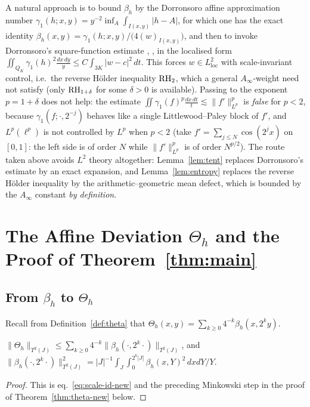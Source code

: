 \begin{remark}\label{rem:why-rh2}
	A natural approach is to bound $\beta_h$ by the Dorronsoro affine approximation
	number $\gamma_1(h;x,y)=y^{-2}\inf_A\int_{I(x,y)}|h-A|$, for which one has the
	exact identity $\beta_h(x,y)=\gamma_1(h;x,y)/\bigl(4(w)_{I(x,y)}\bigr)$, and
	then to invoke Dorronsoro's square-function estimate \cite{Do},
	\cite[Thm.~1.42]{DS}, in the localised form
	$\iint_{Q_K}\gamma_1(h)^2\frac{dx\,dy}{y}\le C\int_{3K}|w-c|^2\,dt$. This forces
	$w\in L^2_{\mathrm{loc}}$ with scale-invariant control, i.e.\ the reverse
	H\"older inequality $\mathrm{RH}_2$, which a general $A_\infty$-weight need not satisfy
	(only $\mathrm{RH}_{1+\delta}$ for some $\delta>0$ is available). Passing to the
	exponent $p=1+\delta$ does not help: the estimate
	$\iint\gamma_1(f)^p\frac{dx\,dt}{t}\lesssim\|f'\|_{L^p}^p$ is \emph{false} for
	$p<2$, because $\gamma_1(f;\cdot,2^{-j})$ behaves like a single
	Littlewood--Paley block of $f'$, and $L^p(\ell^p)$ is not controlled by $L^p$
	when $p<2$ (take $f'=\sum_{j\le N}\cos(2^jx)$ on $[0,1]$: the left side is of
	order $N$ while $\|f'\|_{L^p}^p$ is of order $N^{p/2}$). The route taken above
	avoids $L^2$ theory altogether: Lemma~\ref{lem:tent} replaces Dorronsoro's
	estimate by an exact expansion, and Lemma~\ref{lem:entropy} replaces the
	reverse H\"older inequality by the arithmetic--geometric mean defect, which is
	bounded by the $A_\infty$ constant \emph{by definition}.
\end{remark}

\section{\texorpdfstring{The Affine Deviation $\Theta_h$ and the Proof of Theorem~\ref{thm:main}}{The Affine Deviation Theta_h and the Proof of the Main Theorem}}\label{sec:theta}

\subsection{\texorpdfstring{From $\beta_h$ to $\Theta_h$}{From beta_h to Theta_h}}

Recall from Definition~\ref{def:theta} that
$\Theta_h(x,y)=\sum_{k\ge0}4^{-k}\beta_h(x,2^ky)$.

\begin{lemma}\label{lem:T2norm_theta_le}
	$\|\Theta_h\|_{T^2(J)}\le\sum_{k\ge0}4^{-k}\|\beta_h(\cdot,2^k\cdot)\|_{T^2(J)}$, and $\|\beta_h(\cdot,2^k\cdot)\|_{T^2(J)}^2=|J|^{-1}\int_J\int_0^{2^k|J|}\beta_h(x,Y)^2\,dxdY/Y$.
\end{lemma}
\begin{proof}
	This is eq.~\eqref{eq:scale-id-new} and the preceding Minkowski step in the proof of Theorem~\ref{thm:theta-new} below.
\end{proof}

